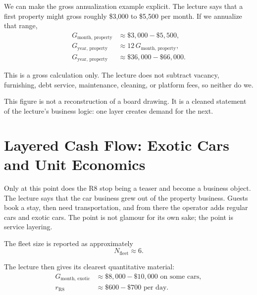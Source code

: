 We can make the gross annualization example explicit. The lecture says that a first property might gross roughly \$3{,}000 to \$5{,}500 per month. If we annualize that range,
\begin{align}
G_{\text{month, property}} &\approx \$3{,}000 - \$5{,}500,\\
G_{\text{year, property}} &\approx 12\,G_{\text{month, property}},\\
G_{\text{year, property}} &\approx \$36{,}000 - \$66{,}000.
\end{align}

This is a gross calculation only. The lecture does not subtract vacancy, furnishing, debt service, maintenance, cleaning, or platform fees, so neither do we.

\begin{figure}
\centering
{}
\end{figure}

This figure is not a reconstruction of a board drawing. It is a cleaned statement of the lecture's business logic: one layer creates demand for the next.

\section{Layered Cash Flow: Exotic Cars and Unit Economics}

Only at this point does the R8 stop being a teaser and become a business object. The lecture says that the car business grew out of the property business. Guests book a stay, then need transportation, and from there the operator adds regular cars and exotic cars. The point is not glamour for its own sake; the point is service layering.

The fleet size is reported as approximately
\begin{equation}
N_{\text{fleet}} \approx 6.
\end{equation}

The lecture then gives its clearest quantitative material:
\begin{align}
G_{\text{month, exotic}} &\approx \$8{,}000 - \$10{,}000 \text{ on some cars},\\
r_{\text{R8}} &\approx \$600 - \$700 \text{ per day}.
\end{align}

